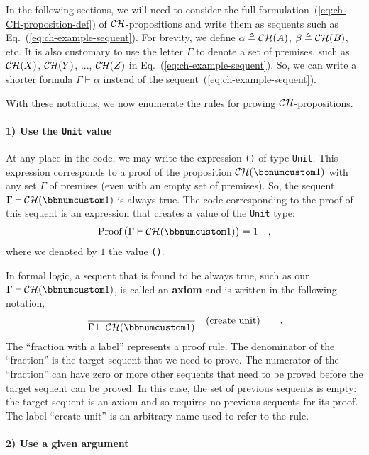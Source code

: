 In the following sections, we will need to consider the full formulation~(\ref{eq:ch-CH-proposition-def})
of ${\cal CH}$-propositions and write them as sequents such as Eq.~(\ref{eq:ch-example-sequent}).
For brevity, we define $\alpha\triangleq{\cal CH}(A)$, $\beta\triangleq{\cal CH}(B)$,
etc. It is also customary to use the letter $\Gamma$ to denote a
set of premises, such as ${\cal CH}(X)$, ${\cal CH}(Y)$, ..., ${\cal CH}(Z)$
in Eq.~(\ref{eq:ch-example-sequent}). So, we can write a shorter
formula $\Gamma\vdash\alpha$ instead of the sequent~(\ref{eq:ch-example-sequent}).

With these notations, we now enumerate the rules for proving ${\cal CH}$-propositions. 

\paragraph{1) Use the \texttt{Unit} value}

At any place in the code, we may write the expression \lstinline!()!
of type \lstinline!Unit!. This expression corresponds to a proof
of the proposition ${\cal CH}(\bbnum 1)$ with any set $\Gamma$ of
premises (even with an empty set of premises). So, the sequent $\Gamma\vdash{\cal CH}(\bbnum 1)$
is always true. The code corresponding to the proof of this sequent
is an expression that creates a value of the \lstinline!Unit! type:
\[
\text{Proof}\,\big(\Gamma\vdash{\cal CH}(\bbnum 1)\big)=1\quad,
\]
where we denoted by $1$ the value \lstinline!()!.

In formal logic, a sequent that is found to be always true, such as
our $\Gamma\vdash{\cal CH}(\bbnum 1)$, is called an \textbf{axiom}
and is written in the following notation,
\[
\frac{}{\Gamma\vdash{\cal CH}(\bbnum 1)}\quad(\text{create unit})\quad\quad.
\]
The \textsf{``}fraction with a label\textsf{''} represents a proof rule. The denominator
of the \textsf{``}fraction\textsf{''} is the target sequent that we need to prove.
The numerator of the \textsf{``}fraction\textsf{''} can have zero or more other sequents
that need to be proved before the target sequent can be proved. In
this case, the set of previous sequents is empty: the target sequent
is an axiom and so requires no previous sequents for its proof. The
label \textsf{``}$\text{create unit}$\textsf{''} is an arbitrary name used to refer
to the rule.

\paragraph{2) Use a given argument}

